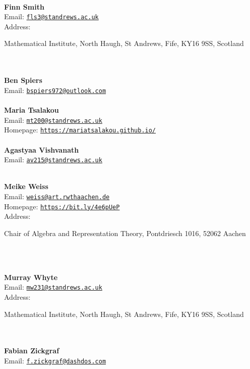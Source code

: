 \documentclass[a4paper,11pt]{report}
\begin{document}
\begin{titlepage}
{\mbox{}\\
\small \noindent \textbf{ Finn Smith\\
   }  Email: \href{mailto://fls3@st-andrews.ac.uk} {\texttt{fls3@st\texttt{}andrews.ac.uk}}\\
  Address: \begin{minipage}[t]{8cm}\noindent
 Mathematical Institute, North Haugh, St Andrews, Fife, KY16 9SS, Scotland\\
 \end{minipage}
}\\
{\mbox{}\\
\small \noindent \textbf{ Ben Spiers\\
  }  Email: \href{mailto://bspiers972@outlook.com} {\texttt{bspiers972@outlook.com}}}\\
{\mbox{}\\
\small \noindent \textbf{ Maria Tsalakou\\
   }  Email: \href{mailto://mt200@st-andrews.ac.uk} {\texttt{mt200@st\texttt{}andrews.ac.uk}}\\
  Homepage: \href{https://mariatsalakou.github.io/} {\texttt{https://mariatsalakou.github.io/}}}\\
{\mbox{}\\
\small \noindent \textbf{ Agastyaa Vishvanath\\
  }  Email: \href{mailto://av215@st-andrews.ac.uk} {\texttt{av215@st\texttt{}andrews.ac.uk}}}\\
{\mbox{}\\
\small \noindent \textbf{ Meike Weiss\\
    }  Email: \href{mailto://weiss@art.rwth-aachen.de} {\texttt{weiss@art.rwth\texttt{}aachen.de}}\\
  Homepage: \href{https://bit.ly/4e6pUeP} {\texttt{https://bit.ly/4e6pUeP}}\\
  Address: \begin{minipage}[t]{8cm}\noindent
 Chair of Algebra and Representation Theory, Pontdriesch
10\texttt{}16, 52062 Aachen\\
 \end{minipage}
}\\
{\mbox{}\\
\small \noindent \textbf{ Murray Whyte\\
   }  Email: \href{mailto://mw231@st-andrews.ac.uk} {\texttt{mw231@st\texttt{}andrews.ac.uk}}\\
  Address: \begin{minipage}[t]{8cm}\noindent
 Mathematical Institute, North Haugh, St Andrews, Fife, KY16 9SS, Scotland\\
 \end{minipage}
}\\
{\mbox{}\\
\small \noindent \textbf{ Fabian Zickgraf\\
  }  Email: \href{mailto://f.zickgraf@dashdos.com} {\texttt{f.zickgraf@dashdos.com}}}\\
\end{titlepage}
\end{document}
